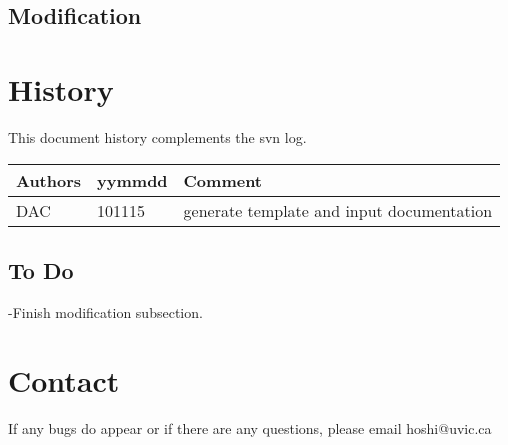 \subsection{Modification}

\section{History} 
This document history complements the svn log.

\begin{tabular*}{\textwidth}{lll}
\hline
Authors & yymmdd & Comment \\
\hline
DAC & 101115 & generate template and input documentation\\

\hline
\end{tabular*}
\subsection{To Do}
-Finish modification subsection.


\section{Contact}
If any bugs do appear or if there are any questions, please email hoshi@uvic.ca



%
%
%
%
